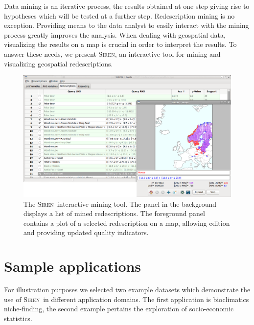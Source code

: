 \documentclass{sig-alternate}
\newcommand{\Siren}{\textsc{Siren}}
\begin{document}
Data mining is an iterative process, the results obtained at one step
giving rise to hypotheses which will be tested at a further step.
Redescription mining is no exception. Providing means to the data
analyst to easily interact with the mining process greatly improves
the analysis.  When dealing with geospatial data, visualizing the
results on a map is crucial in order to interpret the results.  To
answer these needs, we present \Siren, an interactive tool for mining
and visualizing geospatial redescriptions.



\begin{figure}[t]
  \centering
\includegraphics[width=\textwidth]{screenshots/both_panels_02.png}
  \caption{The \Siren\ interactive mining tool. The panel in the background displays a list of mined redescriptions. The foreground panel contains a plot of a selected redescription on a map, allowing edition and providing updated quality indicators.}
  \label{fig:both_panels}
\end{figure}

\section{Sample applications}
For illustration purposes we selected two example datasets which
demonstrate the use of \Siren\ in different application domains.  The
first application is bioclimatics niche-finding, the second example
pertains the exploration of socio-economic statistics.
\end{document}
